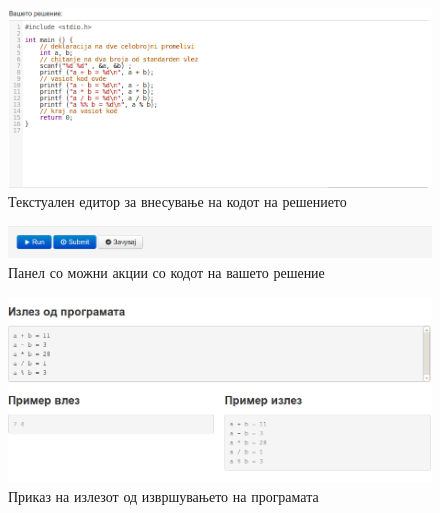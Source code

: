 \begin{figure}[htbp]
\centering
\includegraphics[scale=.4]{images/elab/editor}
\caption{Текстуален едитор за внесување на кодот на решението}
\label{fig:editor}
\end{figure}

\begin{figure}[htbp]
\centering
\includegraphics[scale=.4]{images/elab/actions}
\caption{Панел со можни акции со кодот на вашето решение}
\label{fig:actions}
\end{figure}

\begin{figure}[htbp]
\centering
\includegraphics[scale=.5]{images/elab/output}
\caption{Приказ на излезот од извршувањето на програмата}
\label{fig:output}
\end{figure}


